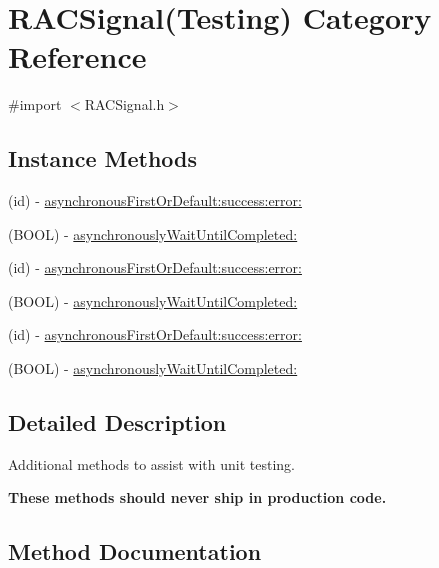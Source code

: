 \hypertarget{category_r_a_c_signal_07_testing_08}{}\section{R\+A\+C\+Signal(Testing) Category Reference}
\label{category_r_a_c_signal_07_testing_08}


{\ttfamily \#import $<$R\+A\+C\+Signal.\+h$>$}

\subsection*{Instance Methods}
\begin{DoxyCompactItemize}
\item 
(id) -\/ \mbox{\hyperlink{category_r_a_c_signal_07_testing_08_a477114852c0e761a023a35e35ccc1784}{asynchronous\+First\+Or\+Default\+:success\+:error\+:}}
\item 
(B\+O\+OL) -\/ \mbox{\hyperlink{category_r_a_c_signal_07_testing_08_a29ac4be53792963e1c7e5c59e545e6cd}{asynchronously\+Wait\+Until\+Completed\+:}}
\item 
(id) -\/ \mbox{\hyperlink{category_r_a_c_signal_07_testing_08_a477114852c0e761a023a35e35ccc1784}{asynchronous\+First\+Or\+Default\+:success\+:error\+:}}
\item 
(B\+O\+OL) -\/ \mbox{\hyperlink{category_r_a_c_signal_07_testing_08_a29ac4be53792963e1c7e5c59e545e6cd}{asynchronously\+Wait\+Until\+Completed\+:}}
\item 
(id) -\/ \mbox{\hyperlink{category_r_a_c_signal_07_testing_08_a477114852c0e761a023a35e35ccc1784}{asynchronous\+First\+Or\+Default\+:success\+:error\+:}}
\item 
(B\+O\+OL) -\/ \mbox{\hyperlink{category_r_a_c_signal_07_testing_08_a29ac4be53792963e1c7e5c59e545e6cd}{asynchronously\+Wait\+Until\+Completed\+:}}
\end{DoxyCompactItemize}


\subsection{Detailed Description}
Additional methods to assist with unit testing.

{\bfseries These methods should never ship in production code.} 

\subsection{Method Documentation}
\mbox{\label{category_r_a_c_signal_07_testing_08_a477114852c0e761a023a35e35ccc1784}} 
